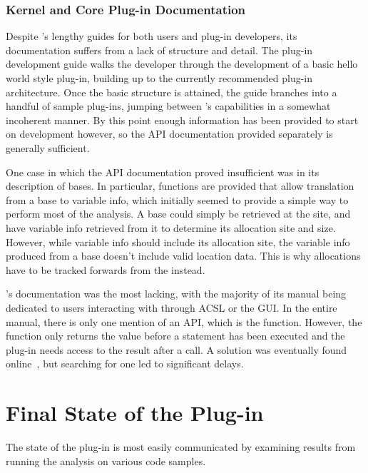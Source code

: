 \subsubsection{Kernel and Core Plug-in Documentation}

Despite 's lengthy guides for both users and plug-in developers, its documentation suffers from a lack of structure and detail. The plug-in development guide walks the developer through the development of a basic hello world style plug-in, building up to the currently recommended plug-in architecture. Once the basic structure is attained, the guide branches into a handful of sample plug-ins, jumping between 's capabilities in a somewhat incoherent manner. By this point enough information has been provided to start on development however, so the API documentation provided separately is generally sufficient.

One case in which the API documentation proved insufficient was in its description of bases. In particular, functions are provided that allow translation from a base to variable info, which initially seemed to provide a simple way to perform most of the analysis. A base could simply be retrieved at the \free{} site, and have variable info retrieved from it to determine its allocation site and size. However, while variable info should include its allocation site, the variable info produced from a base doesn't include valid location data. This is why allocations have to be tracked forwards from the \malloc{} instead.

's documentation was the most lacking, with the majority of its manual being dedicated to users interacting with  through ACSL or the  GUI\@. In the entire manual, there is only one mention of an  API, which is the  function. However, the  function only returns the value before a statement has been executed and the  plug-in needs access to the result after a \malloc{} call. A solution was eventually found online~\cite{foldstate}, but searching for one led to significant delays.

\section{Final State of the Plug-in}\label{pluginstate}

The state of the  plug-in is most easily communicated by examining results from running the analysis on various code samples.

